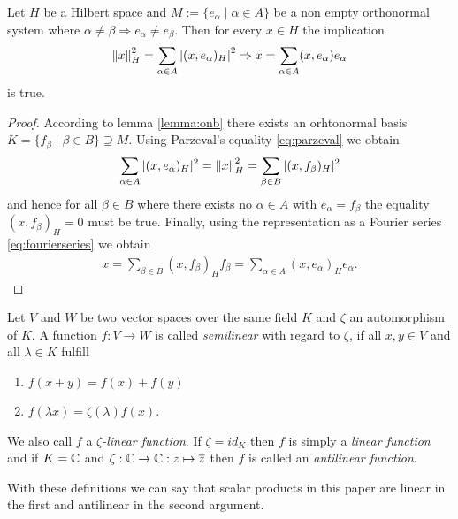 \begin{lemma}
	Let $H$ be a Hilbert space and $M := \{e_\alpha \mid \alpha \in A\}$ be a non empty orthonormal system where $\alpha \neq \beta \Rightarrow e_\alpha \neq e_\beta$. Then for every $x \in H$ the implication
	\begin{align}
		\norm[H]{x}^2 = \sum_{\alpha \in A} \vbraces{(x, e_\alpha)_H}^2 \Rightarrow x = \sum_{\alpha \in A} (x,e_\alpha) e_\alpha \label{eq:parceval_to_fourier}
	\end{align}
	is true.
\end{lemma}

\begin{proof}
	According to lemma \ref{lemma:onb} there exists an orhtonormal basis $K = \{f_\beta \mid \beta \in B\} \supseteq M$. Using Parzeval's equality \eqref{eq:parzeval} we obtain
	\begin{align*}
		\sum_{\alpha \in A} |(x, e_\alpha)_H|^2 = \norm[H]{x}^2 = \sum_{\beta \in B} |(x,f_\beta)_H|^2
	\end{align*}
	and hence for all $\beta \in B$ where there exists no $\alpha \in A$ with $e_\alpha = f_\beta$ the equality $(x, f_\beta)_H = 0$ must be true. Finally, using the representation as a Fourier series \eqref{eq:fourierseries} we obtain
	\begin{align*}
		x = \sum_{\beta \in B} (x,f_\beta)_H f_\beta = \sum_{\alpha \in A} (x,e_\alpha)_H e_\alpha.
	\end{align*}
\end{proof}



\begin{definition}
	Let $V$ and $W$ be two vector spaces over the same field $K$ and $\zeta$ an automorphism of $K$. A function $f: V \to W$ is called \textit{semilinear} with regard to $\zeta$, if all $x,y \in V$ and all $\lambda \in K$ fulfill
	\begin{enumerate}
		\item $f(x + y) = f(x) + f(y)$
		\item $f(\lambda x) = \zeta(\lambda) f(x)$.
	\end{enumerate}
	We also call $f$ a $\zeta$\textit{-linear function}. If $\zeta = id_K$ then $f$ is simply a \textit{linear function} and if $K = \C$ and $\zeta: \C \to \C: z \mapsto \overline{z}$ then $f$ is called an \textit{antilinear function}. 
\end{definition}

With these definitions we can say that scalar products in this paper are linear in the first and antilinear in the second argument. 

